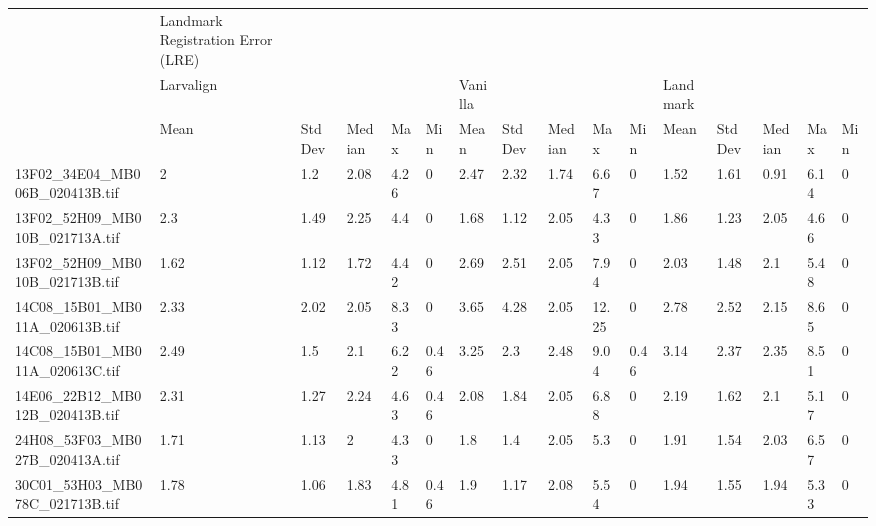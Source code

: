 \begin{tabular}{llllllllllllllll}
\hline
 ﻿                              & Landmark Registration Error (LRE) &         &        &       &      &         &         &        &       &      &          &         &        &      &      \\
                                & Larvalign                         &         &        &       &      & Vanilla &         &        &       &      & Landmark &         &        &      &      \\
                                & Mean                              & Std Dev & Median & Max   & Min  & Mean    & Std Dev & Median & Max   & Min  & Mean     & Std Dev & Median & Max  & Min  \\
 13F02\_34E04\_MB006B\_020413B.tif & 2                                 & 1.2     & 2.08   & 4.26  & 0    & 2.47    & 2.32    & 1.74   & 6.67  & 0    & 1.52     & 1.61    & 0.91   & 6.14 & 0    \\
 13F02\_52H09\_MB010B\_021713A.tif & 2.3                               & 1.49    & 2.25   & 4.4   & 0    & 1.68    & 1.12    & 2.05   & 4.33  & 0    & 1.86     & 1.23    & 2.05   & 4.66 & 0    \\
 13F02\_52H09\_MB010B\_021713B.tif & 1.62                              & 1.12    & 1.72   & 4.42  & 0    & 2.69    & 2.51    & 2.05   & 7.94  & 0    & 2.03     & 1.48    & 2.1    & 5.48 & 0    \\
 14C08\_15B01\_MB011A\_020613B.tif & 2.33                              & 2.02    & 2.05   & 8.33  & 0    & 3.65    & 4.28    & 2.05   & 12.25 & 0    & 2.78     & 2.52    & 2.15   & 8.65 & 0    \\
 14C08\_15B01\_MB011A\_020613C.tif & 2.49                              & 1.5     & 2.1    & 6.22  & 0.46 & 3.25    & 2.3     & 2.48   & 9.04  & 0.46 & 3.14     & 2.37    & 2.35   & 8.51 & 0    \\
 14E06\_22B12\_MB012B\_020413B.tif & 2.31                              & 1.27    & 2.24   & 4.63  & 0.46 & 2.08    & 1.84    & 2.05   & 6.88  & 0    & 2.19     & 1.62    & 2.1    & 5.17 & 0    \\
 24H08\_53F03\_MB027B\_020413A.tif & 1.71                              & 1.13    & 2      & 4.33  & 0    & 1.8     & 1.4     & 2.05   & 5.3   & 0    & 1.91     & 1.54    & 2.03   & 6.57 & 0    \\
 30C01\_53H03\_MB078C\_021713B.tif & 1.78                              & 1.06    & 1.83   & 4.81  & 0.46 & 1.9     & 1.17    & 2.08   & 5.54  & 0    & 1.94     & 1.55    & 1.94   & 5.33 & 0    \\

\end{tabular}

